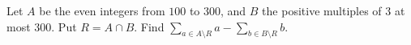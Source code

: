 Let $A$ be the even integers from $100$ to $300$, and $B$ the positive multiples of $3$ at most $300$. Put $R=A\cap B$. Find $\sum_{a\in A\setminus R}a-\sum_{b\in B\setminus R}b$.
